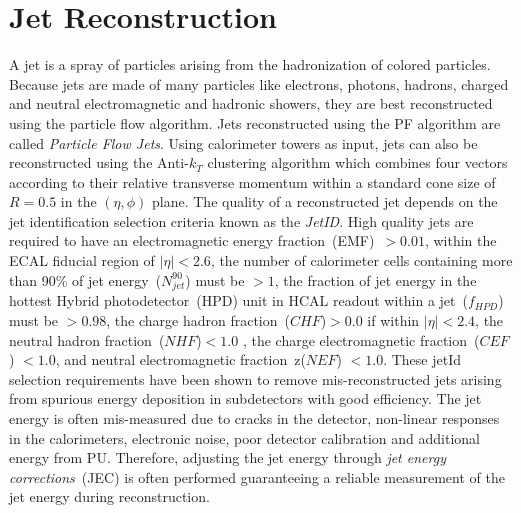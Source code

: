 \section{Jet Reconstruction}
A jet is a spray of particles arising from the hadronization of colored particles. 
Because jets are made of many particles like electrons, photons, hadrons, charged and neutral electromagnetic and hadronic showers, they are best reconstructed using the particle flow algorithm.
Jets reconstructed using the PF algorithm are called \textit{Particle Flow Jets}. Using calorimeter towers as input, jets can also be reconstructed using the Anti-$k_{T}$ clustering algorithm which combines four vectors according to their relative transverse momentum within a standard cone size of $R = 0.5$ in the $(\eta, \phi)$ plane.
The quality of a reconstructed jet depends on the jet identification selection criteria known as the \textit{JetID}.
High quality jets are required to have an electromagnetic energy fraction~(EMF)~$ > 0.01$,  within the ECAL fiducial region of $|\eta| < 2.6$, the number of calorimeter cells containing more than 90\% of jet energy~($N^{90}_{jet}$) must be $ > 1$, the fraction of jet energy in the hottest  Hybrid photodetector~(HPD) unit  in HCAL readout within a jet~($f_{HPD}$) must be $ > 0.98$, the charge  hadron fraction~($CHF$)$ >0.0$ if within $|\eta| < 2.4$, the neutral hadron fraction~($NHF$)$ < 1.0$ , the charge electromagnetic fraction~($CEF$) $ < 1.0$, and neutral electromagnetic fraction~z($NEF$) $< 1.0 $. These jetId selection requirements have been shown to remove mis-reconstructed jets arising from spurious energy deposition in subdetectors with good efficiency.
The jet energy is often mis-measured due to cracks in the detector, non-linear responses in the calorimeters, electronic noise, poor detector calibration and additional energy from PU. Therefore, adjusting the jet energy through \textit{jet energy corrections}~(JEC) is often performed guaranteeing a reliable measurement of the jet energy during reconstruction. 


